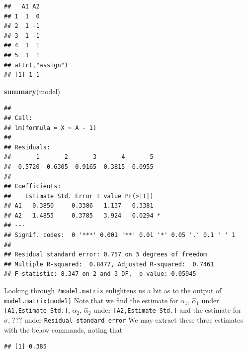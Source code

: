 \documentclass[
]{article}
\newenvironment{Shaded}{\begin{snugshade}}{\end{snugshade}}
\newcommand{\CommentTok}[1]{\textcolor[rgb]{0.56,0.35,0.01}{\textit{#1}}}
\newcommand{\DecValTok}[1]{\textcolor[rgb]{0.00,0.00,0.81}{#1}}
\newcommand{\KeywordTok}[1]{\textcolor[rgb]{0.13,0.29,0.53}{\textbf{#1}}}
\newcommand{\NormalTok}[1]{#1}
\newcommand{\OperatorTok}[1]{\textcolor[rgb]{0.81,0.36,0.00}{\textbf{#1}}}
\begin{document}
\begin{verbatim}
##   A1 A2
## 1  1  0
## 2  1 -1
## 3  1 -1
## 4  1  1
## 5  1  1
## attr(,"assign")
## [1] 1 1
\end{verbatim}

\begin{Shaded}
\begin{Highlighting}[]
\KeywordTok{summary}\NormalTok{(model)}
\end{Highlighting}
\end{Shaded}

\begin{verbatim}
## 
## Call:
## lm(formula = X ~ A - 1)
## 
## Residuals:
##       1       2       3       4       5 
## -0.5720 -0.6305  0.9165  0.3815 -0.0955 
## 
## Coefficients:
##    Estimate Std. Error t value Pr(>|t|)  
## A1   0.3850     0.3386   1.137   0.3381  
## A2   1.4855     0.3785   3.924   0.0294 *
## ---
## Signif. codes:  0 '***' 0.001 '**' 0.01 '*' 0.05 '.' 0.1 ' ' 1
## 
## Residual standard error: 0.757 on 3 degrees of freedom
## Multiple R-squared:  0.8477, Adjusted R-squared:  0.7461 
## F-statistic: 8.347 on 2 and 3 DF,  p-value: 0.05945
\end{verbatim}

Looking through \texttt{?model.matrix} enlightens us a bit as to the
output of \texttt{model.matrix(model)} Note that we find the estimate
for \(\alpha_1,\,\hat\alpha_1\) under \texttt{{[}A1,Estimate\ Std.{]}},
\(\alpha_2,\,\hat\alpha_2\) under \texttt{{[}A2,Estimate\ Std.{]}} and
the estimate for \(\sigma,\,???\) under
\texttt{Residual\ standard\ error} We may extract these three estimates
with the below commands, noting that

\begin{Shaded}
\end{Shaded}

\begin{verbatim}
## [1] 0.385
\end{verbatim}

\begin{Shaded}
\end{Shaded}
\end{document}
